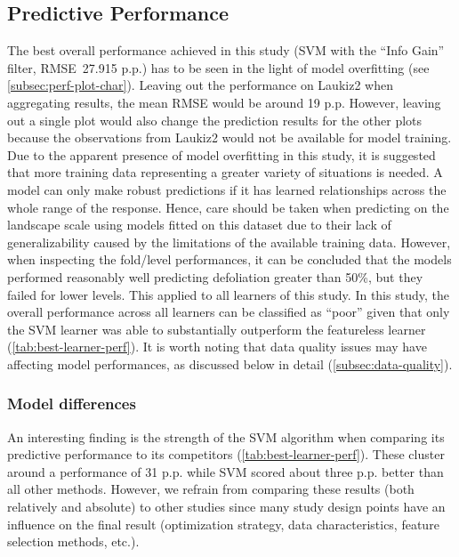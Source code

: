 \documentclass[remotesensing,article,submit,moreauthors,pdftex]{Definitions/mdpi}
\begin{document}
\subsection{Predictive Performance}

The best overall performance achieved in this study (SVM with the \enquote{Info Gain} filter, RMSE~27.915 p.p.) has to be seen in the light of model overfitting (see \autoref{subsec:perf-plot-char}).
Leaving out the performance on Laukiz2 when aggregating results, the mean RMSE would be around 19 p.p.
However, leaving out a single plot would also change the prediction results for the other plots because the observations from Laukiz2 would not be available for model training.
Due to the apparent presence of model overfitting in this study, it is suggested that more training data representing a greater variety of situations is needed.
A model can only make robust predictions if it has learned relationships across the whole range of the response.
Hence, care should be taken when predicting on the landscape scale using models fitted on this dataset due to their lack of generalizability caused by the limitations of the available training data.
However, when inspecting the fold\-/level performances, it can be concluded that the models performed reasonably well predicting defoliation greater than 50\%, but they failed for lower levels.
This applied to all learners of this study.
In this study, the overall performance across all learners can be classified as ``poor'' given that only the SVM learner was able to substantially outperform the featureless learner (\autoref{tab:best-learner-perf}).
It is worth noting that data quality issues may have affecting model performances, as discussed below in detail  (\autoref{subsec:data-quality}).

\subsubsection{Model differences}

An interesting finding is the strength of the SVM algorithm when comparing its predictive performance to its competitors (\autoref{tab:best-learner-perf}).
These cluster around a performance of 31 p.p. while SVM scored about three p.p. better than all other methods.
However, we refrain from comparing these results (both relatively and absolute) to other studies since many study design points have an influence on the final result (optimization strategy, data characteristics, feature selection methods, etc.).
\end{document}
